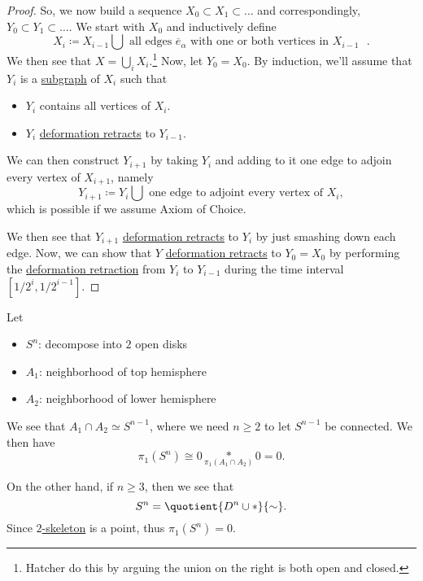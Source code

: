 \begin{proof}
	So, we now build a sequence \(X_0\subset X_1\subset \ldots  \) and correspondingly, \(Y_0\subset Y_1\subset \ldots\). We start with
	\(X_0\) and inductively define
	\[
		X_i \coloneqq X_{i-1}\bigcup \text{ all edges \(\overline{e} _\alpha \) with one or both vertices in \(X_{i-1}\) }.
	\]
	We then see that \(X = \bigcup_{i} X_{i} \).\footnote{Hatcher\cite{hatcher2002algebraic} do this by arguing the union on the right is both open and closed.}
	Now, let \(Y_0 = X_0\). By induction, we'll assume that \(Y_{i}\) is a \hyperref[def:subgraph]{subgraph} of \(X_{i}\) such that
	\begin{itemize}
		\item \(Y_{i}\) contains all vertices of \(X_{i}\).
		\item \(Y_{i}\) \hyperref[def:deformation-retraction]{deformation retracts} to \(Y_{i-1}\).
	\end{itemize}
	We can then construct \(Y_{i+1}\) by taking \(Y_{i}\) and adding to it one edge to adjoin every vertex of \(X_{i+1}\), namely
	\[
		Y_{i+1} \coloneqq  Y_{i}\bigcup \text{ one edge to adjoint every vertex of \(X_{i}\)},
	\]
	which is possible if we assume Axiom of Choice.

	We then see that \(Y_{i+1}\) \hyperref[def:deformation-retraction]{deformation retracts} to \(Y_{i}\) by just smashing down each edge. Now, we can show that
	\(Y\) \hyperref[def:deformation-retraction]{deformation retracts} to \(Y_0 = X_0\) by performing the \hyperref[def:deformation-retraction]{deformation retraction}
	from \(Y_{i}\) to \(Y_{i-1}\) during the time interval \([1/2^i, 1/2^{i-1}]\).
\end{proof}

\begin{eg}
	Let
	\begin{itemize}
		\item \(S^n\): decompose into \(2\) open disks
		\item \(A_1\): neighborhood of top hemisphere
		\item \(A_2\): neighborhood of lower hemisphere
	\end{itemize}
	We see that \(A_1 \cap A_2\simeq S^{n-1}\), where we need \(n\geq 2\) to let \(S^{n-1}\) be connected. We then have
	\[
		\pi _1(S^n)\cong 0\underset{\pi _1(A_1 \cap A_2)}{\ast}0 = 0.
	\]

	On the other hand, if \(n\geq 3\), then we see that
	\[
		S^n = \quotient{D^{n} \cup \ast}{\sim} .
	\]
	Since \hyperref[def:skeleton]{\(2\)-skeleton} is a point, thus \(\pi _1(S^n) = 0\).
\end{eg}